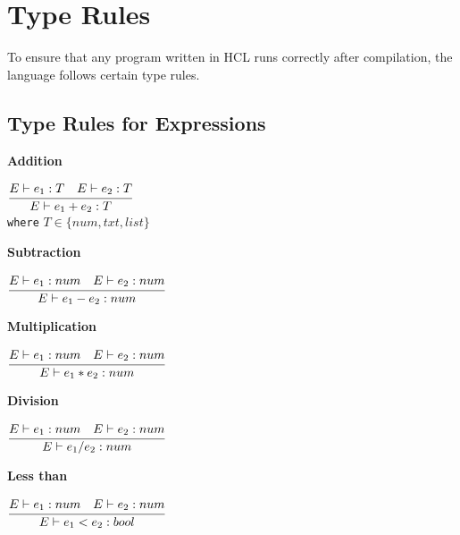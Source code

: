 \section{Type Rules}
To ensure that any program written in HCL runs correctly after compilation, the language follows certain type rules.


\subsection{Type Rules for Expressions}
\textbf{Addition}\\
\begin{center}
	\begin{math}
	\cfrac
	{E \vdash e_1: T \quad E \vdash e_2: T}
	{E \vdash e_1 + e_2 : T}
	\end{math}\\[1\baselineskip]
	\texttt{where} $T \in \{num, txt, list\}$
\end{center}

\textbf{Subtraction}\\
\begin{center}
	\begin{math}
	\cfrac
	{E \vdash e_1: num \quad E \vdash e_2: num}
	{E \vdash e_1 - e_2 : num}
	\end{math}
\end{center}

\textbf{Multiplication}\\
\begin{center}
	\begin{math}
	\cfrac
	{E \vdash e_1: num \quad E \vdash e_2: num}
	{E \vdash e_1 * e_2 : num}
	\end{math}
\end{center}

\textbf{Division}\\
\begin{center}
	\begin{math}
	\cfrac
	{E \vdash e_1: num \quad E \vdash e_2: num}
	{E \vdash e_1 / e_2 : num}
	\end{math}
\end{center}

\textbf{Less than}\\
\begin{center}
	\begin{math}
	\cfrac
	{E \vdash e_1: num \quad E \vdash e_2: num}
	{E \vdash e_1 < e_2 : bool}
	\end{math}
\end{center}

